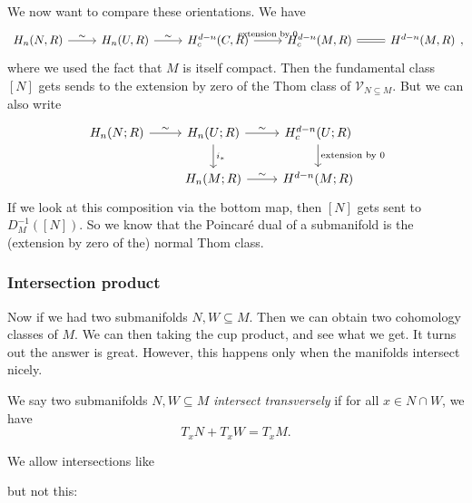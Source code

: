 \documentclass[a4paper]{article}
\begin{document}
We now want to compare these orientations. We have
\[
  \begin{tikzcd}
    H_n(N, R) \ar[r, "\sim"] & H_n(U, R) \ar[r, "\sim"] & H_c^{d - n}(C, R) \ar[r, "\text{extension by }0"] & H_c^{d - n}(M, R) \ar[r, equals] & H^{d - n}(M, R)
  \end{tikzcd},
\]
where we used the fact that $M$ is itself compact. Then the fundamental class $[N]$ gets sends to the extension by zero of the Thom class of $\mathcal{V}_{N \subseteq M}$.
But we can also write
\[
  \begin{tikzcd}
    H_n(N; R) \ar[r, "\sim"] & H_n(U; R) \ar[r, "\sim"] \ar[d, "i_*"] & H_c^{d - n}(U; R) \ar[d, "\text{extension by }0"] \\
    & H_n(M; R) \ar[r, "\sim"] & H^{d - n}(M; R)
  \end{tikzcd}
\]
If we look at this composition via the bottom map, then $[N]$ gets sent to $D_M^{-1}([N])$. So we know that the Poincar\'e dual of a submanifold is the (extension by zero of the) normal Thom class. %

\subsubsection*{Intersection product}
Now if we had two submanifolds $N, W \subseteq M$. Then we can obtain two cohomology classes of $M$. We can then taking the cup product, and see what we get. It turns out the answer is great. However, this happens only when the manifolds intersect nicely.
\begin{defi}
  We say two submanifolds $N, W \subseteq M$ \emph{intersect transversely} if for all $x \in N \cap W$, we have
  \[
    T_x N + T_x W = T_x M.
  \]
\end{defi}

\begin{eg}
  We allow intersections like
  \begin{center}
  \end{center}
  but not this:
  \begin{center}
  \end{center}
\end{eg}
\end{document}
